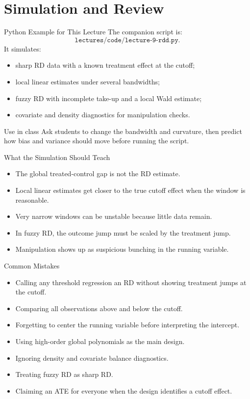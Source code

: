 \documentclass[11pt,aspectratio=169]{beamer}
\begin{document}
\section{Simulation and Review}

\begin{frame}{Python Example for This Lecture}
  The companion script is:
  \[
    \texttt{lectures/code/lecture-9-rdd.py}.
  \]
  It simulates:
  \begin{itemize}
    \item sharp RD data with a known treatment effect at the cutoff;
    \item local linear estimates under several bandwidths;
    \item fuzzy RD with incomplete take-up and a local Wald estimate;
    \item covariate and density diagnostics for manipulation checks.
  \end{itemize}
  \begin{block}{Use in class}
    Ask students to change the bandwidth and curvature, then predict how bias and variance should move before running the script.
  \end{block}
\end{frame}

\begin{frame}{What the Simulation Should Teach}
  \begin{itemize}
    \item The global treated-control gap is not the RD estimate.
    \item Local linear estimates get closer to the true cutoff effect when the window is reasonable.
    \item Very narrow windows can be unstable because little data remain.
    \item In fuzzy RD, the outcome jump must be scaled by the treatment jump.
    \item Manipulation shows up as suspicious bunching in the running variable.
  \end{itemize}
\end{frame}

\begin{frame}{Common Mistakes}
  \small
  \begin{itemize}
    \item Calling any threshold regression an RD without showing treatment jumps at the cutoff.
    \item Comparing all observations above and below the cutoff.
    \item Forgetting to center the running variable before interpreting the intercept.
    \item Using high-order global polynomials as the main design.
    \item Ignoring density and covariate balance diagnostics.
    \item Treating fuzzy RD as sharp RD.
    \item Claiming an ATE for everyone when the design identifies a cutoff effect.
  \end{itemize}
\end{frame}
\end{document}
